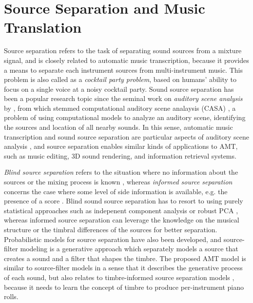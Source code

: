 \section{Source Separation and Music Translation}\label{sec:separation}

Source separation refers to the task of separating sound sources from a mixture signal, and is closely related to automatic music transcription, because it provides a means to separate each instrument sources from multi-instrument music.
This problem is also called as a \emph{cocktail party problem}, based on humans' ability to focus on a single voice at a noisy cocktail party.
Sound source separation has been a popular research topic since the seminal work on \emph{auditory scene analysis} by , from which stemmed computational auditory scene analaysis (CASA) \cite{brown1994casa}, a problem of using computational models to analyze an auditory scene, identifying the sources and location of all nearby sounds.
In this sense, automatic music transcription and sound source separation are particular aspects of auditory scene analysis \cite{plumbley2002transcription}, and source separation enables similar kinds of applications to AMT, such as music editing, 3D sound rendering, and information retrieval systems.


\emph{Blind source separation} refers to the situation where no information about the sources or the mixing process is known \cite{bell1995blind}, whereas \emph{informed source separation} \cite{vincent2013separation} concerns the case where some level of side information is available, e.g. the presence of a score \cite{ewert2014separation}.
Blind sound source separation has to resort to using purely statistical approaches such as indepenent component analysis \cite{saruwatari2006ica} or robust PCA \cite{huang2012separation}, whereas informed source separation can leverage the knowledge on the musical structure \cite{rafii2013separation, liutkus2012separation} or the timbral differences of the sources \cite{li2007separation,ono2010hpss} for better separation.
Probabilistic models for source separation \cite{ozerov2007separation,leglaive2016prior} have also been developed, and source-filter modeling \cite{heittola2009separation,durrieu2011separation} is a generative approach which separately models a source that creates a sound and a filter that shapes the timbre.
The proposed AMT model is similar to source-filter models in a sense that it describes the generative process of each sound, but also relates to timbre-informed source separation models \cite{miron2018thesis}, because it needs to learn the concept of timbre to produce per-instrument piano rolls.


